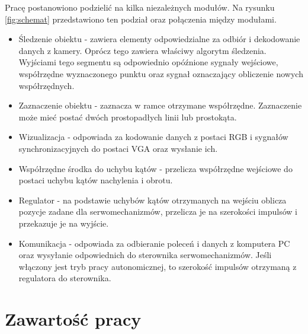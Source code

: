 Pracę postanowiono podzielić na kilka niezależnych modułów. Na rysunku \ref{fig:schemat} przedstawiono ten podział oraz połączenia między modułami.
\begin{itemize}
\item Śledzenie obiektu - zawiera elementy odpowiedzialne za odbiór i dekodowanie danych z kamery. Oprócz tego zawiera właściwy algorytm śledzenia. Wyjściami tego segmentu są odpowiednio opóźnione sygnały wejściowe, współrzędne wyznaczonego punktu oraz sygnał oznaczający obliczenie nowych współrzędnych.
\item Zaznaczenie obiektu - zaznacza w ramce otrzymane współrzędne. Zaznaczenie może mieć postać dwóch prostopadłych linii lub prostokąta.
\item Wizualizacja - odpowiada za kodowanie danych z postaci RGB i sygnałów synchronizacyjnych do postaci VGA oraz wysłanie ich.
\item Współrzędne środka do uchybu kątów - przelicza współrzędne wejściowe do postaci uchybu kątów nachylenia i obrotu.
\item Regulator - na podstawie uchybów kątów otrzymanych na wejściu oblicza pozycje zadane dla serwomechanizmów, przelicza je na szerokości impulsów i przekazuje je na wyjście.
\item Komunikacja - odpowiada za odbieranie poleceń i danych z komputera PC oraz wysyłanie odpowiednich do sterownika serwomechanizmów. Jeśli włączony jest tryb pracy autonomicznej, to szerokość impulsów otrzymaną z regulatora do sterownika.
\end{itemize}

\section{Zawartość pracy}
\label{sec:zawartoscpracy}


